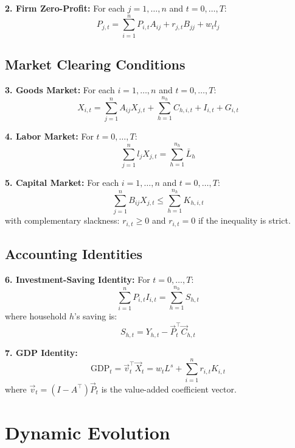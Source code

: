 \documentclass[12pt,a4paper]{article}
\theoremstyle{definition}
\theoremstyle{remark}
\begin{document}
\textbf{2. Firm Zero-Profit:} For each $j = 1,\ldots,n$ and $t = 0,\ldots,T$:
\begin{equation}
    P_{j,t} = \sum_{i=1}^n P_{i,t} A_{ij} + r_{j,t} B_{jj} + w_t l_j
\end{equation}

\subsection{Market Clearing Conditions}

\textbf{3. Goods Market:} For each $i = 1,\ldots,n$ and $t = 0,\ldots,T$:
\begin{equation}
    X_{i,t} = \sum_{j=1}^n A_{ij} X_{j,t} + \sum_{h=1}^{n_h} C_{h,i,t} + I_{i,t} + G_{i,t}
\end{equation}

\textbf{4. Labor Market:} For $t = 0,\ldots,T$:
\begin{equation}
    \sum_{j=1}^n l_j X_{j,t} = \sum_{h=1}^{n_h} \bar{L}_h
\end{equation}

\textbf{5. Capital Market:} For each $i = 1,\ldots,n$ and $t = 0,\ldots,T$:
\begin{equation}
    \sum_{j=1}^n B_{ij} X_{j,t} \leq \sum_{h=1}^{n_h} K_{h,i,t}
\end{equation}
with complementary slackness: $r_{i,t} \geq 0$ and $r_{i,t} = 0$ if the inequality is strict.

\subsection{Accounting Identities}

\textbf{6. Investment-Saving Identity:} For $t = 0,\ldots,T$:
\begin{equation}
    \sum_{i=1}^n P_{i,t} I_{i,t} = \sum_{h=1}^{n_h} S_{h,t}
\end{equation}
where household $h$'s saving is:
\begin{equation}
    S_{h,t} = Y_{h,t} - \vec{P}_t^\top \vec{C}_{h,t}
\end{equation}

\textbf{7. GDP Identity:}
\begin{equation}
    \text{GDP}_t = \vec{v}_t^\top \vec{X}_t = w_t L^s + \sum_{i=1}^n r_{i,t} K_{i,t}
\end{equation}
where $\vec{v}_t = (I - A^\top)\vec{P}_t$ is the value-added coefficient vector.

\section{Dynamic Evolution}
\end{document}
